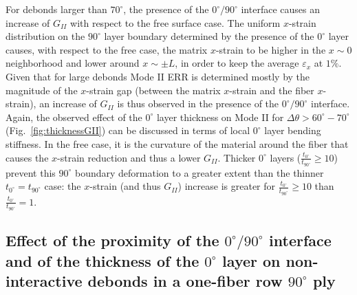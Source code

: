 \documentclass[Review,sagev,times]{sagej}
\begin{document}
For debonds larger than $70^{\circ}$, the presence of the $0^{\circ}/90^{\circ}$ interface causes an increase of $G_{II}$ with respect to the free surface case. The uniform $x$-strain distribution on the $90^{\circ}$ layer boundary determined by the presence of the $0^{\circ}$ layer causes, with respect to the free case, the matrix $x$-strain to be higher in the $x\sim0$ neighborhood and lower around $x\sim\pm L$, in order to keep the average $\varepsilon_{x}$ at $1\%$. Given that for large debonds Mode II ERR is determined mostly by the magnitude of the $x$-strain gap (between the matrix $x$-strain and the fiber $x$-strain), an increase of $G_{II}$ is thus observed in the presence of the $0^{\circ}/90^{\circ}$ interface. Again, the observed effect of the $0^{\circ}$ layer thickness on Mode II for $\Delta\theta>60^{\circ}-70^{\circ}$ (Fig.~\ref{fig:thicknessGII}) can be discussed in terms of local $0^{\circ}$ layer bending stiffness. In the free case, it is the curvature of the material around the fiber that causes the $x$-strain reduction and thus a lower $G_{II}$. Thicker $0^{\circ}$ layers ($\frac{t_{0^{\circ}}}{t_{90^{\circ}}}\geq10$) prevent this $90^{\circ}$ boundary deformation to a greater extent than the thinner $t_{0^{\circ}}=t_{90^{\circ}}$ case: the $x$-strain (and thus $G_{II}$) increase is greater for $\frac{t_{0^{\circ}}}{t_{90^{\circ}}}\geq10$ than $\frac{t_{0^{\circ}}}{t_{90^{\circ}}}=1$.

\subsection{Effect of the proximity of the $0^{\circ}/90^{\circ}$ interface and of the thickness of the $0^{\circ}$ layer on non-interactive debonds in a one-fiber row $90^{\circ}$ ply}\label{subsec:debonddebondinter}
\end{document}
